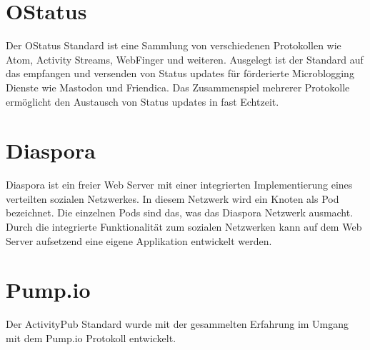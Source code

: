 \section{OStatus}
\label{sub:ostatus}
	Der OStatus Standard ist eine Sammlung von verschiedenen Protokollen wie Atom, Activity Streams, WebFinger und weiteren. Ausgelegt ist der Standard auf das empfangen und versenden von Status updates für förderierte Microblogging Dienste wie Mastodon und Friendica. Das Zusammenspiel mehrerer Protokolle ermöglicht den Austausch von Status updates in fast Echtzeit.\\
\section{Diaspora}
\label{sub:diaspora}
	Diaspora ist ein freier Web Server mit einer integrierten Implementierung eines verteilten sozialen Netzwerkes. In diesem Netzwerk wird ein Knoten als Pod bezeichnet. Die einzelnen Pods sind das, was das Diaspora Netzwerk ausmacht. Durch die integrierte Funktionalität zum sozialen Netzwerken kann auf dem Web Server aufsetzend eine eigene Applikation entwickelt werden.\\
\section{Pump.io}
\label{sub:pumpio}
	Der ActivityPub Standard wurde mit der gesammelten Erfahrung im Umgang mit dem Pump.io Protokoll entwickelt.\\
